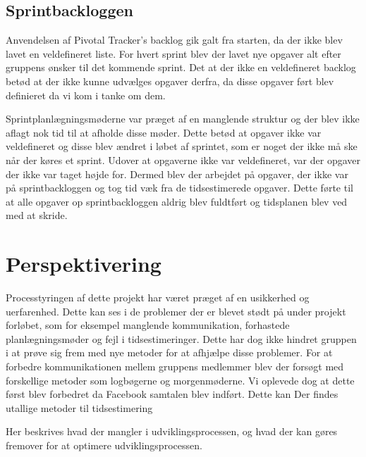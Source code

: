 \section{Sprintbackloggen}
Anvendelsen af Pivotal Tracker's backlog gik galt fra starten, da der ikke blev lavet en veldefineret liste. For hvert sprint blev der lavet nye opgaver alt efter gruppens ønsker til det kommende sprint. Det at der ikke en veldefineret backlog betød at der ikke kunne udvælges opgaver derfra, da disse opgaver ført blev definieret da vi kom i tanke om dem. \par
Sprintplanlægningsmøderne var præget af en manglende struktur og der blev ikke aflagt nok tid til at afholde disse møder. Dette betød at opgaver ikke var veldefineret og disse blev ændret i løbet af sprintet, som er noget der ikke må ske når der køres et sprint. Udover at opgaverne ikke var veldefineret, var der opgaver der ikke var taget højde for. Dermed blev der arbejdet på opgaver, der ikke var på sprintbackloggen og tog tid væk fra de tidsestimerede opgaver. Dette førte til at alle opgaver op sprintbackloggen aldrig blev fuldtført og tidsplanen blev ved med at skride.  

\chapter{Perspektivering}
Processtyringen af dette projekt har været præget af en usikkerhed og uerfarenhed. Dette kan ses i de problemer der er blevet stødt på under projekt forløbet, som for eksempel manglende kommunikation, forhastede planlægningsmøder og fejl i tidsestimeringer. Dette har dog ikke hindret gruppen i at prøve sig frem med nye metoder for at afhjælpe disse problemer. 
For at forbedre kommunikationen mellem gruppens medlemmer blev der forsøgt med forskellige metoder som logbøgerne og morgenmøderne. Vi oplevede dog at dette først blev forbedret da Facebook samtalen blev indført. 
Dette kan 
Der findes utallige metoder til tidsestimering 

Her beskrives hvad der mangler i udviklingsprocessen, og hvad der kan gøres
fremover for at optimere udviklingsprocessen. 